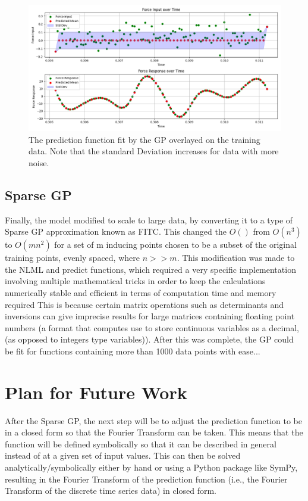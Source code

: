 \documentclass[12pt]{article}
\begin{document}
    \begin{figure}[htbp]
        \centering
        \includegraphics[width=1.0\linewidth]{figures/input-response-predict/input-response-predict.png}
        \caption{The prediction function fit by the GP overlayed on the training data. Note that the standard Deviation increases for data with more noise.}
        \label{fig:input-response-predict}
    \end{figure}

    \subsection{Sparse GP}
    Finally, the model modified to scale to large data, by converting it to a type of Sparse GP approximation known as FITC.
    This changed the $O()$ from $O(n^3)$ to $O(mn^2)$ for a set of m inducing points chosen to be a subset of the original training points, evenly spaced, where $n >> m$.
    This modification was made to the NLML and predict functions, which required a very specific implementation involving multiple mathematical tricks in order to keep the calculations numerically stable and efficient in terms of computation time and memory required
    This is because certain matrix operations such as determinants and inversions can give imprecise results for large matrices containing floating point numbers (a format that computes use to store continuous variables as a decimal, (as opposed to integers type variables)).
    After this was complete, the GP could be fit for functions containing more than 1000 data points with ease...

    \section{Plan for Future Work}
    After the Sparse GP, the next step will be to adjust the prediction function to be in a closed form so that the Fourier Transform can be taken.
    This means that the function will be defined symbolically so that it can be described in general instead of at a given set of input values.
    This can then be solved analytically/symbolically either by hand or using a Python package like SymPy, resulting in the Fourier Transform of the prediction function (i.e., the Fourier Transform of the discrete time series data) in closed form.
\end{document}

